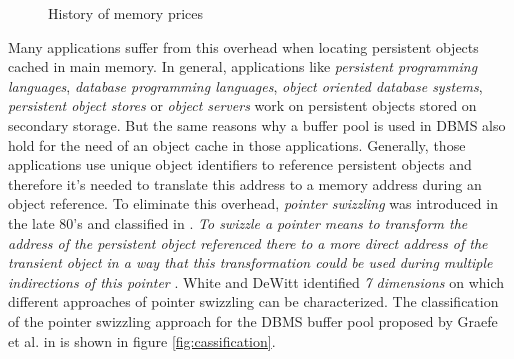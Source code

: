 \begin{@empty}

	
	\begin{figure}[ht!]
		\centering
        \vspace{.25em}
		\caption[History of memory prices]{History of memory prices\footnotemark}
		\label{fig:memorycost}
	\end{figure}
\end{@empty}


	Many applications suffer from this overhead when locating persistent objects cached in main memory. In general, applications like \textit{persistent programming languages}, \textit{database programming languages}, \textit{object oriented database systems}, \textit{persistent object stores} or \textit{object servers} work on persistent objects stored on secondary storage. But the same reasons why a buffer pool is used in DBMS also hold for the need of an object cache in those applications. Generally, those applications use unique object identifiers to reference persistent objects and therefore it's needed to translate this address to a memory address during an object reference. To eliminate this overhead, \emph{pointer swizzling} was introduced in the late 80's and classified in \cite{White:1995}. \emph{To swizzle a pointer means to transform the address of the persistent object referenced there to a more direct address of the transient object in a way that this transformation could be used during multiple indirections of this pointer} \cite{Moss:1992}. White and DeWitt identified \emph{7 dimensions} on which different approaches of pointer swizzling can be characterized. The classification of the pointer swizzling approach for the DBMS buffer pool proposed by Graefe et al. in \cite{Graefe:2014} is shown in figure \ref{fig:cassification}.
	

